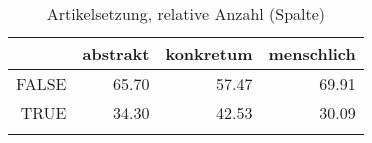 \begin{table}[ht]
\centering
\begin{tabular}{rrrr}
  \lsptoprule
 & abstrakt & konkretum & menschlich \\ 
  \midrule
FALSE & 65.70 & 57.47 & 69.91 \\ 
  TRUE & 34.30 & 42.53 & 30.09 \\ 
   \lspbottomrule
\end{tabular}
\caption{Artikelsetzung, relative Anzahl (Spalte)} 
\end{table}
